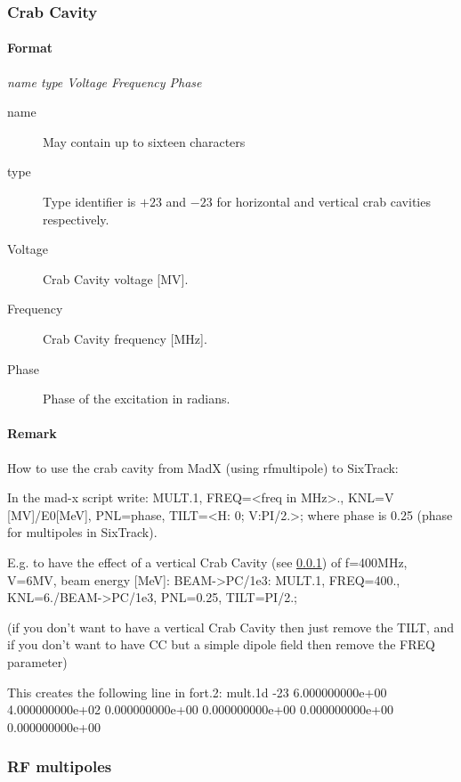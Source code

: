 \documentclass[a4paper,11pt]{report}
\begin{document}

\subsubsection{Crab Cavity} \label{CrabCav}

\paragraph{Format} {\em name type Voltage Frequency Phase}
\begin{description}
\item [name] May contain up to sixteen characters
\item [type] Type identifier is $+23$ and $-23$ for horizontal and vertical
  crab cavities respectively.
\item [Voltage] Crab Cavity voltage [MV].
\item [Frequency] Crab Cavity frequency [MHz]. 
\item [Phase] Phase of the excitation in radians.
\end{description}

\paragraph{Remark}

How to use the crab cavity from MadX (using rfmultipole) to SixTrack:

In the mad-x script write:
MULT.1, FREQ=<freq in MHz>., KNL={V [MV]/E0[MeV]}, PNL={phase}, TILT=<H: 0; V:PI/2.>; where phase is 0.25 (phase for multipoles in SixTrack).

E.g. to have the effect of a vertical Crab Cavity (see \ref{CrabCav}) of f=400MHz, V=6MV, beam energy [MeV]: BEAM->PC/1e3: 
MULT.1, FREQ=400., KNL={6./BEAM->PC/1e3}, PNL={0.25}, TILT=PI/2.; 

(if you don’t want to have a vertical Crab Cavity then just remove the TILT, 
and if you don’t want to have CC but a simple dipole field then remove the FREQ parameter)

This creates the following line in fort.2: 
mult.1d          -23   6.000000000e+00   4.000000000e+02    0.000000000e+00    0.000000000e+00    0.000000000e+00    0.000000000e+00


\subsubsection{RF multipoles}
\end{document}
